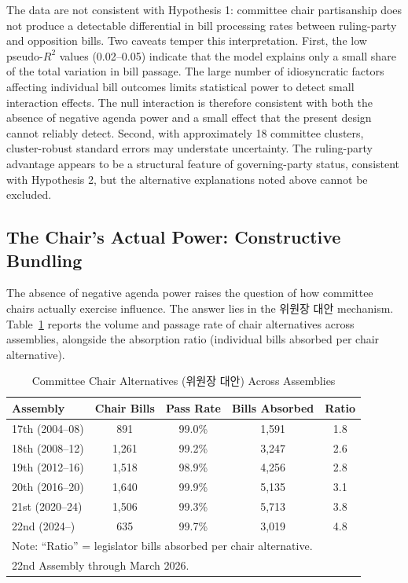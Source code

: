 \documentclass[11pt]{article}
\begin{document}
The data are not consistent with Hypothesis 1: committee chair partisanship does not produce a detectable differential in bill processing rates between ruling-party and opposition bills. Two caveats temper this interpretation. First, the low pseudo-$R^2$ values (0.02--0.05) indicate that the model explains only a small share of the total variation in bill passage. The large number of idiosyncratic factors affecting individual bill outcomes limits statistical power to detect small interaction effects. The null interaction is therefore consistent with both the absence of negative agenda power and a small effect that the present design cannot reliably detect. Second, with approximately 18 committee clusters, cluster-robust standard errors may understate uncertainty. The ruling-party advantage appears to be a structural feature of governing-party status, consistent with Hypothesis 2, but the alternative explanations noted above cannot be excluded.

\subsection{The Chair's Actual Power: Constructive Bundling}

The absence of negative agenda power raises the question of how committee chairs actually exercise influence. The answer lies in the 위원장 대안 mechanism. Table~\ref{tab:bundling} reports the volume and passage rate of chair alternatives across assemblies, alongside the absorption ratio (individual bills absorbed per chair alternative).

\begin{table}[H]
\centering
\caption{Committee Chair Alternatives (위원장 대안) Across Assemblies}
\label{tab:bundling}
\begin{tabular}{lcccc}
\toprule
Assembly & Chair Bills & Pass Rate & Bills Absorbed & Ratio \\
\midrule
17th (2004--08) & 891 & 99.0\% & 1,591 & 1.8 \\
18th (2008--12) & 1,261 & 99.2\% & 3,247 & 2.6 \\
19th (2012--16) & 1,518 & 98.9\% & 4,256 & 2.8 \\
20th (2016--20) & 1,640 & 99.9\% & 5,135 & 3.1 \\
21st (2020--24) & 1,506 & 99.3\% & 5,713 & 3.8 \\
22nd (2024--) & 635 & 99.7\% & 3,019 & 4.8 \\
\bottomrule
\multicolumn{5}{l}{\footnotesize Note: ``Ratio'' = legislator bills absorbed per chair alternative.} \\
\multicolumn{5}{l}{\footnotesize 22nd Assembly through March 2026.} \\
\end{tabular}
\end{table}
\end{document}
